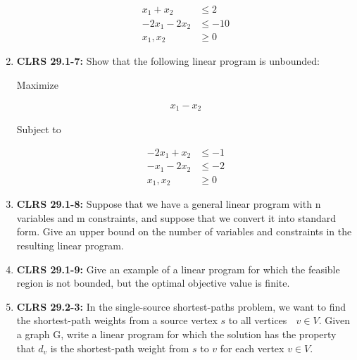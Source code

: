 \documentclass[12pt]{article}
\begin{document}
\begin{enumerate}[1.]
    \begin{align*}
        x_1 + x_2 &\leq 2\\
        -2x_1 - 2x_2 &\leq -10\\
        x_1, x_2 &\geq 0
    \end{align*}

    \item \textbf{CLRS 29.1-7:} Show that the following linear program is unbounded:

    \bigskip

    Maximize

    \begin{align*}
        x_1 - x_2
    \end{align*}

    Subject to

    \begin{align*}
        -2x_1 + x_2 &\leq -1\\
        -x_1 - 2x_2 &\leq -2\\
        x_1,x_2 &\geq 0
    \end{align*}

    \item \textbf{CLRS 29.1-8:} Suppose that we have a general linear program with n variables and m constraints,
    and suppose that we convert it into standard form. Give an upper bound on the
    number of variables and constraints in the resulting linear program.

    \item \textbf{CLRS 29.1-9:} Give an example of a linear program for which the feasible region is not bounded,
    but the optimal objective value is finite.

    \item \textbf{CLRS 29.2-3:} In the single-source shortest-paths problem, we want to find the shortest-path
    weights from a source vertex $s$ to all vertices  $v \in V$. Given a graph G, write a
    linear program for which the solution has the property that $d_v$ is the shortest-path
    weight from $s$ to $v$ for each vertex $v \in V$.


\end{enumerate}
\end{document}
